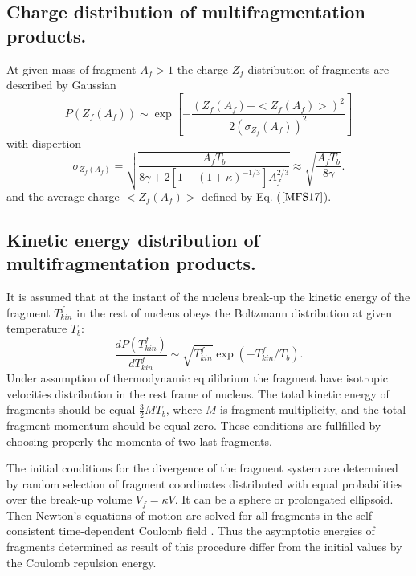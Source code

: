 \subsection{ Charge distribution of multifragmentation products.}

\hspace{1.0em}At given mass of fragment $A_f > 1$ the charge $Z_f$
distribution of fragments are described by Gaussian
\begin{equation}
\label{MFS20} P(Z_f(A_f))\sim \exp{[-\frac{(Z_f(A_f) - 
<Z_f(A_f)>)^2}{2(\sigma_{Z_f}(A_f))^2}]}
\end{equation} 
with dispertion 
\begin{equation}
\label{MFS21}\sigma_{Z_f(A_f)} = \sqrt{\frac{A_fT_b}
{8 \gamma + 2[1 - (1 +\kappa)^{-1/3}]A_f^{2/3}}} 
\approx \sqrt{\frac{A_fT_b}{8 \gamma}}.
\end{equation} 
and the average charge $<Z_f(A_f)>$ defined by Eq. ($\ref{MFS17}$).

\subsection{ Kinetic energy distribution of multifragmentation products.}

\hspace{1.0em}It is assumed \cite{Botvina87} that at the instant of the
nucleus break-up the kinetic energy of the fragment $T^{f}_{kin}$ in the
rest of nucleus obeys the Boltzmann distribution at given temperature
$T_b$:
\begin{equation}
\label{MFS22} \frac{dP(T^{f}_{kin})}{dT^{f}_{kin}}\sim \sqrt{T^{f}_{kin}}
\exp{(-T^{f}_{kin}/T_b)}.
\end{equation}
Under assumption of thermodynamic equilibrium the fragment have
isotropic velocities distribution in the rest frame of nucleus. The
total kinetic energy of fragments should be equal $\frac{3}{2}MT_b$,
where $M$ is fragment multiplicity, and the total fragment momentum
should be equal zero. These conditions are fullfilled by choosing
properly the momenta of two last fragments.

The initial conditions for the divergence of the fragment system are
determined by random selection of fragment coordinates distributed with
equal probabilities over the break-up volume $V_f = \kappa V$. It can be
a sphere or prolongated ellipsoid. Then Newton's equations of motion are
solved for all fragments in the self-consistent time-dependent Coulomb
field \cite{Botvina87}.  Thus the asymptotic energies of fragments
determined as result of this procedure differ from the initial values by
the Coulomb repulsion energy.

